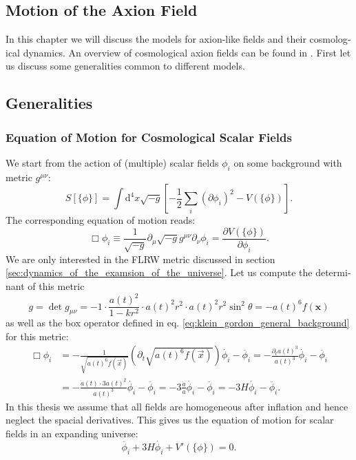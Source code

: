 \documentclass[master,       %
               twoside,        %
               BCOR10mm,       %
               english,ngerman, %
               ]{GAUBM}
\begin{document}
\begin{otherlanguage}{english}
\chapter{Motion of the Axion Field}
\label{sec:motion_of_the_axion_field}

In this chapter we will discuss the models for axion-like fields and their cosmological dynamics.
An overview of cosmological axion fields can be found in \cite{MarshAxionCosmo}.
First let us discuss some generalities common to different models.

\section{Generalities}

\subsection{Equation of Motion for Cosmological Scalar Fields}
We start from the action of (multiple) scalar fields $\phi_i$ on some background with metric $g^{\mu \nu}$:
\begin{equation}
	S[\{\phi\}] = \int \mathrm{d}^4 x \sqrt{-g} \left[- \frac{1}{2} \sum_i (\partial \phi_i)^2 - V(\{\phi\}) \right].
\end{equation}
The corresponding equation of motion reads:
\begin{equation}
	\label{eq:klein_gordon_general_background}
	\Box \phi_i \equiv \frac{1}{\sqrt{-g}} \partial_\mu \sqrt{-g} g^{\mu \nu} \partial_\nu \phi_i = \frac{\partial V(\{\phi\})}{\partial \phi_i}.
\end{equation}
We are only interested in the FLRW metric discussed in section \ref{sec:dynamics_of_the_examsion_of_the_universe}.
Let us compute the determinant of this metric
\begin{equation}
	g = \det g_{\mu \nu} = -1 \cdot \frac{a(t)^2}{1 - kr^2} \cdot a(t)^2 r^2 \cdot a(t)^2 r^2 \sin^2 \theta = - a(t)^6 f(\mathbf{x})
\end{equation}
as well as the box operator defined in eq. \eqref{eq:klein_gordon_general_background} for this metric:
\begin{align}
	    \Box \phi_i
	    &= - \frac{1}{\sqrt{a(t)^6 f(\vec{x})}} (\partial_t \sqrt{ a(t)^6 f(\vec{x}) }) \dot{\phi_i} - \ddot{\phi_i}
	    = - \frac{\partial_t a(t)^3}{a(t)^3} \dot{\phi_i} - \ddot{\phi_i} \nonumber \\
	    &= - \frac{\dot{a}(t) \cdot 3 a(t)^2}{a(t)^3} \dot{\phi_i} - \ddot{\phi_i}
	    = - 3 \frac{\dot{a}}{a} \dot{\phi_i} - \ddot{\phi_i}
	    = - 3H \dot{\phi_i} - \ddot{\phi_i}.
\end{align}
In this thesis we assume that all fields are homogeneous after inflation and hence neglect the spacial derivatives.
This gives us the equation of motion for scalar fields in an expanding universe:
\begin{equation}
	\label{eq:scalar_field_eom}
	\boxed{
	\ddot{\phi_i} + 3 H \dot{\phi_i} + V'(\{\phi\}) = 0.
	}
\end{equation}


\end{otherlanguage}
\end{document}
